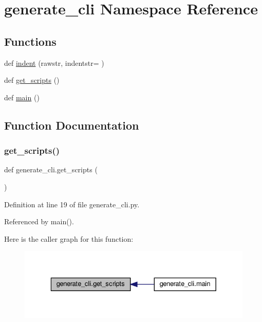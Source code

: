 \hypertarget{namespacegenerate__cli}{}\section{generate\+\_\+cli Namespace Reference}
\label{namespacegenerate__cli}
\subsection*{Functions}
\begin{DoxyCompactItemize}
\item 
def \hyperlink{namespacegenerate__cli_a398461fabd4559f4d4d041df98c8cb43}{indent} (rawstr, indentstr=\textquotesingle{} \textquotesingle{})
\item 
def \hyperlink{namespacegenerate__cli_a88235ac81a788e005e9aa0dd7624307c}{get\+\_\+scripts} ()
\item 
def \hyperlink{namespacegenerate__cli_ac2397b33242e0f40a20f33a2ea5beebf}{main} ()
\end{DoxyCompactItemize}


\subsection{Function Documentation}
\mbox{\label{namespacegenerate__cli_a88235ac81a788e005e9aa0dd7624307c}} 
\subsubsection{\texorpdfstring{get\+\_\+scripts()}{get\_scripts()}}
{\footnotesize\ttfamily def generate\+\_\+cli.\+get\+\_\+scripts (\begin{DoxyParamCaption}{ }\end{DoxyParamCaption})}



Definition at line 19 of file generate\+\_\+cli.\+py.



Referenced by main().

Here is the caller graph for this function\+:
\nopagebreak
\begin{figure}[H]
\begin{center}
\leavevmode
\includegraphics[width=329pt]{namespacegenerate__cli_a88235ac81a788e005e9aa0dd7624307c_icgraph}
\end{center}
\end{figure}
\mbox{\label{namespacegenerate__cli_a398461fabd4559f4d4d041df98c8cb43}} 
